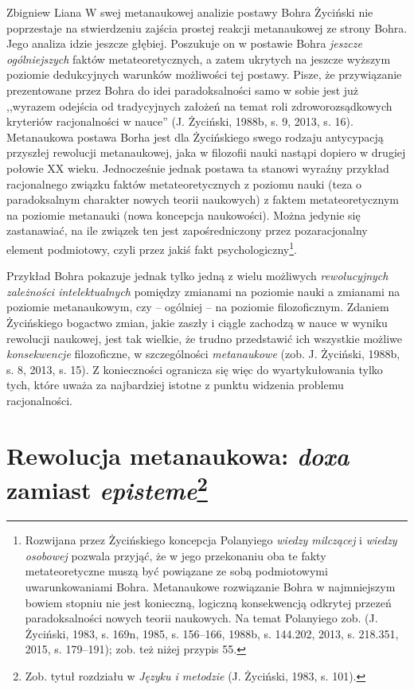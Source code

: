\begin{artplenv}{Zbigniew Liana}
W swej metanaukowej analizie postawy Bohra Życiński nie poprzestaje na stwierdzeniu zajścia prostej reakcji metanaukowej
ze strony Bohra. Jego analiza idzie jeszcze głębiej. Poszukuje on w postawie Bohra \textit{jeszcze} \textit{ogólniejszych
}faktów metateoretycznych, a zatem ukrytych na jeszcze wyższym poziomie dedukcyjnych warunków możliwości tej postawy.
Pisze, że przywiązanie prezentowane przez Bohra do idei paradoksalności samo w sobie jest już ,,wyrazem odejścia od
tradycyjnych założeń na temat roli zdroworozsądkowych kryteriów racjonalności w nauce'' \label{ref:RND7AT9mZ6IoG}(J.
Życiński, 1988b, s. 9, 2013, s. 16). Metanaukowa postawa Borha jest dla Życińskiego swego rodzaju antycypacją przyszłej
rewolucji metanaukowej, jaka w filozofii nauki nastąpi dopiero w drugiej połowie XX wieku. Jednocześnie jednak postawa
ta stanowi wyraźny przykład racjonalnego związku faktów metateoretycznych z poziomu nauki (teza o paradoksalnym
charakter nowych teorii naukowych) z faktem metateoretycznym na poziomie metanauki (nowa koncepcja naukowości). Można
jedynie się zastanawiać, na ile związek ten jest zapośredniczony przez pozaracjonalny element podmiotowy, czyli przez
jakiś fakt psychologiczny\footnote{Rozwijana przez Życińskiego koncepcja Polanyiego \textit{wiedzy milczącej} i
	\textit{wiedzy osobowej }pozwala przyjąć, że w jego przekonaniu oba te fakty metateoretyczne muszą być powiązane ze sobą
	podmiotowymi uwarunkowaniami Bohra. Metanaukowe rozwiązanie Bohra w najmniejszym bowiem stopniu nie jest konieczną,
	logiczną konsekwencją odkrytej przezeń paradoksalności nowych teorii naukowych. Na temat Polanyiego zob.
	\label{ref:RNDgm9vg5CtBx}(J. Życiński, 1983, s. 169n, 1985, s. 156–166, 1988b, s. 144.202, 2013, s. 218.351, 2015, s.
	179–191); zob. też niżej przypis 55.}.

Przykład Bohra pokazuje jednak tylko jedną z wielu możliwych \textit{rewolucyjnych zależności intelektualnych} pomiędzy
zmianami na poziomie nauki a zmianami na poziomie metanaukowym, czy -- ogólniej -- na poziomie filozoficznym. Zdaniem
Życińskiego bogactwo zmian, jakie zaszły i ciągle zachodzą w nauce w wyniku rewolucji naukowej, jest tak wielkie, że
trudno przedstawić ich wszystkie możliwe \textit{konsekwencje} filozoficzne, w szczególności \textit{metanaukowe}
\label{ref:RNDJXAyHhUuS3}(zob. J. Życiński, 1988b, s. 8, 2013, s. 15). Z konieczności ogranicza się więc do
wyartykułowania tylko tych, które uważa za najbardziej istotne z punktu widzenia problemu racjonalności.

\section[Rewolucja metanaukowa: \textit{doxa} zamiast \textit{episteme}]{Rewolucja metanaukowa: \textit{doxa} zamiast \textit{episteme}\footnote{Zob. tytuł rozdziału w \textit{Języku i metodzie} \label{ref:RNDDNOb8iCJVi}(J. Życiński, 1983, s. 101).}}


\end{artplenv}
